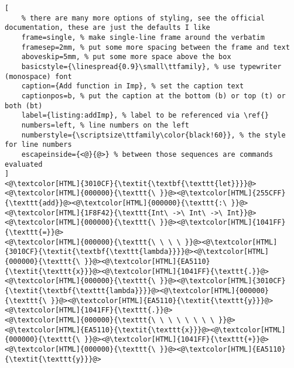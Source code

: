 \begin{lstlisting}[
	% there are many more options of styling, see the official documentation, these are just the defaults I like
	frame=single, % make single-line frame around the verbatim
	framesep=2mm, % put some more spacing between the frame and text
	aboveskip=5mm, % put some more space above the box
	basicstyle={\linespread{0.9}\small\ttfamily}, % use typewriter (monospace) font
	caption={Add function in Imp}, % set the caption text
	captionpos=b, % put the caption at the bottom (b) or top (t) or both (bt)
    label={listing:addImp}, % label to be referenced via \ref{}
	numbers=left, % line numbers on the left
	numberstyle={\scriptsize\ttfamily\color{black!60}}, % the style for line numbers
	escapeinside={<@}{@>} % between those sequences are commands evaluated
]
<@\textcolor[HTML]{3010CF}{\textit{\textbf{\texttt{let}}}}@><@\textcolor[HTML]{000000}{\texttt{\ }}@><@\textcolor[HTML]{255CFF}{\texttt{add}}@><@\textcolor[HTML]{000000}{\texttt{:\ }}@><@\textcolor[HTML]{1F8F42}{\texttt{Int\ ->\ Int\ ->\ Int}}@><@\textcolor[HTML]{000000}{\texttt{\ }}@><@\textcolor[HTML]{1041FF}{\texttt{=}}@>
<@\textcolor[HTML]{000000}{\texttt{\ \ \ \ }}@><@\textcolor[HTML]{3010CF}{\textit{\textbf{\texttt{lambda}}}}@><@\textcolor[HTML]{000000}{\texttt{\ }}@><@\textcolor[HTML]{EA5110}{\textit{\texttt{x}}}@><@\textcolor[HTML]{1041FF}{\texttt{.}}@><@\textcolor[HTML]{000000}{\texttt{\ }}@><@\textcolor[HTML]{3010CF}{\textit{\textbf{\texttt{lambda}}}}@><@\textcolor[HTML]{000000}{\texttt{\ }}@><@\textcolor[HTML]{EA5110}{\textit{\texttt{y}}}@><@\textcolor[HTML]{1041FF}{\texttt{.}}@>
<@\textcolor[HTML]{000000}{\texttt{\ \ \ \ \ \ \ \ }}@><@\textcolor[HTML]{EA5110}{\textit{\texttt{x}}}@><@\textcolor[HTML]{000000}{\texttt{\ }}@><@\textcolor[HTML]{1041FF}{\texttt{+}}@><@\textcolor[HTML]{000000}{\texttt{\ }}@><@\textcolor[HTML]{EA5110}{\textit{\texttt{y}}}@>

\end{lstlisting}